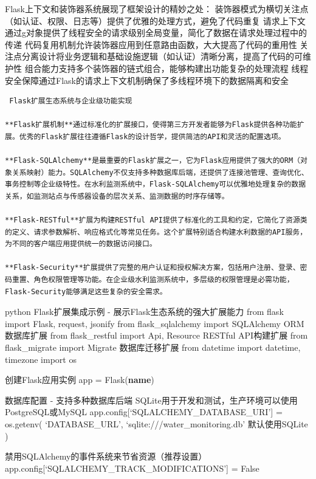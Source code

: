  Flask上下文和装饰器系统展现了框架设计的精妙之处：  装饰器模式为横切关注点（如认证、权限、日志等）提供了优雅的处理方式，避免了代码重复  请求上下文通过g对象提供了线程安全的请求级别全局变量，简化了数据在请求处理过程中的传递  代码复用机制允许装饰器应用到任意路由函数，大大提高了代码的重用性  关注点分离设计将业务逻辑和基础设施逻辑（如认证）清晰分离，提高了代码的可维护性  组合能力支持多个装饰器的链式组合，能够构建出功能复杂的处理流程  线程安全保障通过Flask的请求上下文机制确保了多线程环境下的数据隔离和安全

\begin{lstlisting}
 Flask扩展生态系统与企业级功能实现

**Flask扩展机制**通过标准化的扩展接口，使得第三方开发者能够为Flask提供各种功能扩展。优秀的Flask扩展往往遵循Flask的设计哲学，提供简洁的API和灵活的配置选项。

**Flask-SQLAlchemy**是最重要的Flask扩展之一，它为Flask应用提供了强大的ORM（对象关系映射）能力。SQLAlchemy不仅支持多种数据库后端，还提供了连接池管理、查询优化、事务控制等企业级特性。在水利监测系统中，Flask-SQLAlchemy可以优雅地处理复杂的数据关系，如监测站点与传感器设备的层次关系、监测数据的时序存储等。

**Flask-RESTful**扩展为构建RESTful API提供了标准化的工具和约定，它简化了资源类的定义、请求参数解析、响应格式化等常见任务。这个扩展特别适合构建水利数据的API服务，为不同的客户端应用提供统一的数据访问接口。

**Flask-Security**扩展提供了完整的用户认证和授权解决方案，包括用户注册、登录、密码重置、角色权限管理等功能。在企业级水利监测系统中，多层级的权限管理是必需功能，Flask-Security能够满足这些复杂的安全需求。
\end{lstlisting}

python  Flask扩展集成示例 - 展示Flask生态系统的强大扩展能力 from flask import Flask, request, jsonify from flask\_sqlalchemy import SQLAlchemy  ORM数据库扩展 from flask\_restful import Api, Resource  RESTful API构建扩展 from flask\_migrate import Migrate  数据库迁移扩展 from datetime import datetime, timezone import os

 创建Flask应用实例 app = Flask(\textbf{name})

 数据库配置 - 支持多种数据库后端  SQLite用于开发和测试，生产环境可以使用PostgreSQL或MySQL app.config{[}`SQLALCHEMY\_DATABASE\_URI'{]} = os.getenv( `DATABASE\_URL', `sqlite:///water\_monitoring.db'  默认使用SQLite )

 禁用SQLAlchemy的事件系统来节省资源（推荐设置） app.config{[}`SQLALCHEMY\_TRACK\_MODIFICATIONS'{]} = False

